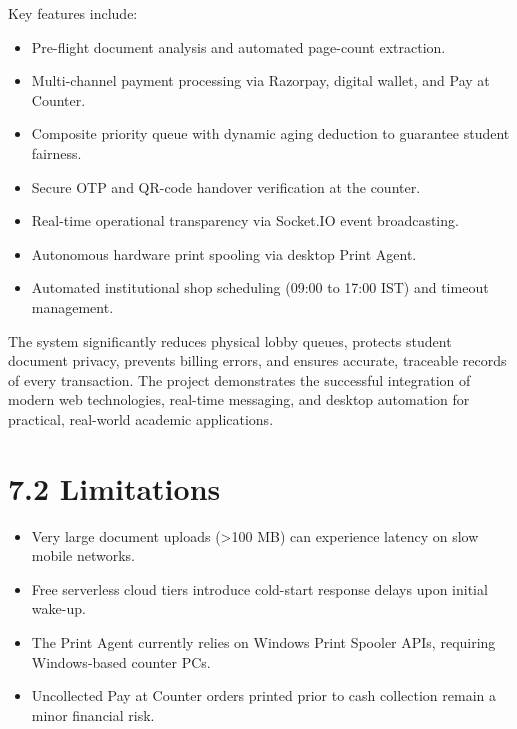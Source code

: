 \documentclass[12pt,a4paper]{report}
\begin{document}
Key features include:
\begin{itemize}[leftmargin=0.35in, itemsep=2pt]
  \item Pre-flight document analysis and automated page-count extraction.
  \item Multi-channel payment processing via Razorpay, digital wallet, and Pay at Counter.
  \item Composite priority queue with dynamic aging deduction to guarantee student fairness.
  \item Secure OTP and QR-code handover verification at the counter.
  \item Real-time operational transparency via Socket.IO event broadcasting.
  \item Autonomous hardware print spooling via desktop Print Agent.
  \item Automated institutional shop scheduling (09:00 to 17:00 IST) and timeout management.
\end{itemize}
The system significantly reduces physical lobby queues, protects student document privacy, prevents billing errors, and ensures accurate, traceable records of every transaction. The project demonstrates the successful integration of modern web technologies, real-time messaging, and desktop automation for practical, real-world academic applications.

\section{7.2 Limitations}
\begin{itemize}[leftmargin=0.35in, itemsep=2pt]
  \item Very large document uploads (>100 MB) can experience latency on slow mobile networks.
  \item Free serverless cloud tiers introduce cold-start response delays upon initial wake-up.
  \item The Print Agent currently relies on Windows Print Spooler APIs, requiring Windows-based counter PCs.
  \item Uncollected Pay at Counter orders printed prior to cash collection remain a minor financial risk.
\end{itemize}
\end{document}
